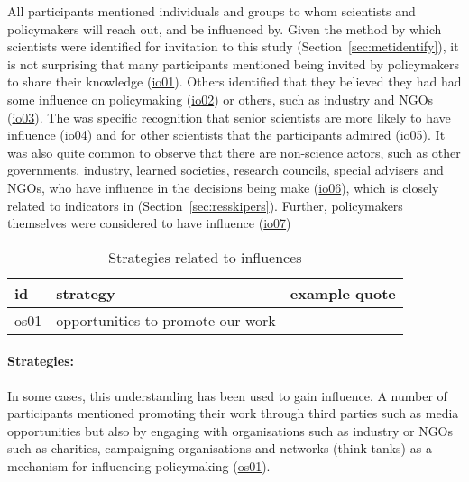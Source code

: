 All participants mentioned individuals and groups to whom scientists and policymakers will reach out, and be influenced by. Given the method by which scientists were identified for invitation to this study (Section~\ref{sec:metidentify}), it is not surprising that many participants mentioned being invited by policymakers to share their knowledge (\hyperref[tab:resskiopin]{io01}). Others identified that they believed they had had some influence on policymaking (\hyperref[tab:resskiopin]{io02}) or others, such as industry and NGOs (\hyperref[tab:resskiopin]{io03}). The was specific recognition that senior scientists are more likely to have influence (\hyperref[tab:resskiopin]{io04}) and for other scientists that the participants admired (\hyperref[tab:resskiopin]{io05}). It was also quite common to observe that there are non-science actors, such as other governments, industry, learned societies, research councils, special advisers and NGOs, who have influence in the decisions being make (\hyperref[tab:resskiopin]{io06}), which is closely related to indicators in \skipers{} (Section~\ref{sec:resskipers}). Further, policymakers themselves were considered to have influence (\hyperref[tab:resskiopin]{io07})

\begin{table}[!ht]
\footnotesize
\caption{Strategies related to \skiopin{} influences}\label{tab:resskiopinstrat}
\begin{tabular}{L{.06\linewidth}L{.3\linewidth}L{.64\linewidth}} \hline
\textbf{id} & \textbf{strategy} & \textbf{example quote} \\ \hline \hline
os01 & opportunities to promote our work &  \\[5mm]
\hline
 \end{tabular}
\end{table}

\paragraph{Strategies:}
In some cases, this understanding has been used to gain influence. A number of participants mentioned promoting their work through third parties such as media opportunities but also by engaging with organisations such as industry or NGOs such as charities, campaigning organisations and networks (think tanks) as a mechanism for influencing policymaking (\hyperref[tab:resskiopinstrat]{os01}).

